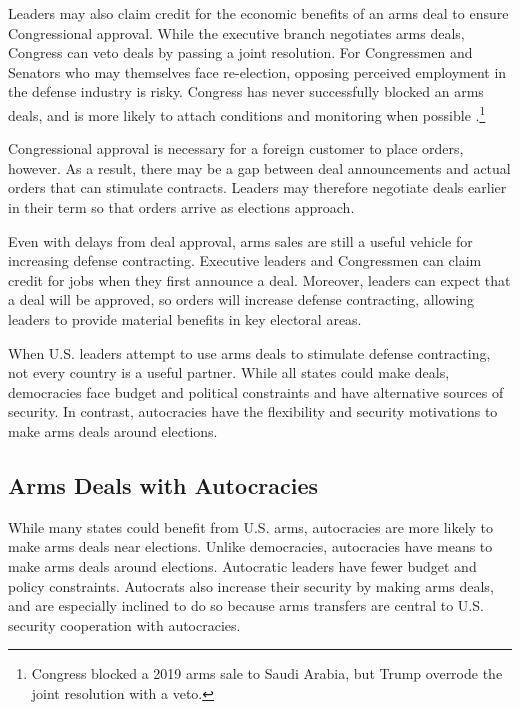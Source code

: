 \documentclass[12pt]{article}
\begin{document}

Leaders may also claim credit for the economic benefits of an arms deal to ensure Congressional approval. 
While the executive branch negotiates arms deals, Congress can veto deals by passing a joint resolution. 
For Congressmen and Senators who may themselves face re-election, opposing perceived employment in the defense industry is risky.
Congress has never successfully blocked an arms deals, and is more likely to attach conditions and monitoring when possible \citep{Thralletal2020}.\footnote{Congress blocked a 2019 arms sale to Saudi Arabia, but Trump overrode the joint resolution with a veto.}


Congressional approval is necessary for a foreign customer to place orders, however. 
As a result, there may be a gap between deal announcements and actual orders that can stimulate contracts.
Leaders may therefore negotiate deals earlier in their term so that orders arrive as elections approach.  


Even with delays from deal approval, arms sales are still a useful vehicle for increasing defense contracting. 
Executive leaders and Congressmen can claim credit for jobs when they first announce a deal. 
Moreover, leaders can expect that a deal will be approved, so orders will increase defense contracting, allowing leaders to provide material benefits in key electoral areas. 


When U.S. leaders attempt to use arms deals to stimulate defense contracting, not every country is a useful partner. 
While all states could make deals, democracies face budget and political constraints and have alternative sources of security.
In contrast, autocracies have the flexibility and security motivations to make arms deals around elections.



\subsection{Arms Deals with Autocracies}


While many states could benefit from U.S. arms, autocracies are more likely to make arms deals near elections. 
Unlike democracies, autocracies have means to make arms deals around elections.
Autocratic leaders have fewer budget and policy constraints. 
Autocrats also increase their security by making arms deals, and are especially inclined to do so because arms transfers are central to U.S. security cooperation with autocracies.
\end{document}
